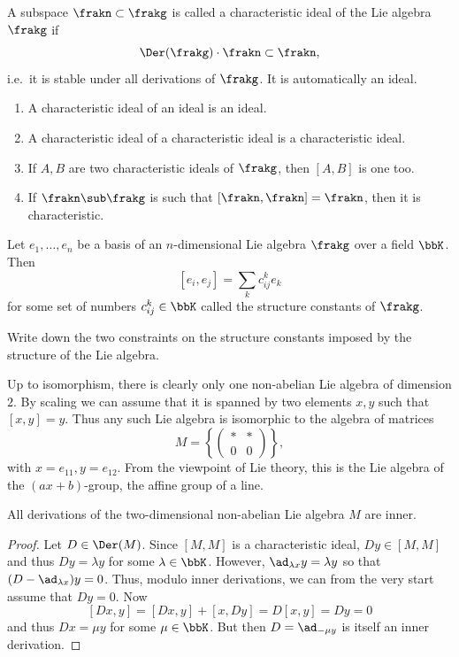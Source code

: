 \begin{defn}
    A subspace $\frakn\subset \frakg$ is called a characteristic ideal of the Lie algebra $\frakg$ if 
    \[\Der(\frakg)\cdot \frakn\subset \frakn,\]
    i.e.~it is stable under all derivations of $\frakg$. It is automatically an ideal.
\end{defn}

\begin{xca}
\begin{enumerate}
    \item A characteristic ideal of an ideal is an ideal.
    \item A characteristic ideal of a characteristic ideal is a characteristic ideal.
    \item If $A,B$ are two characteristic ideals of $\frakg$, then $[A,B]$ is one too.
    \item If $\frakn\sub \frakg$ is such that $[\frakn,\frakn]=\frakn$, then it is characteristic.
\end{enumerate}
\end{xca}

\begin{defn}
    Let $e_1,\ldots,e_n$ be a basis of an $n$-dimensional Lie algebra $\frakg$ over a field $\bbK$. Then
    \[[e_i,e_j]=\sum_k c_{ij}^k e_k\]
    for some set of numbers $c_{ij}^k\in\bbK$ called the structure constants of $\frakg$.
\end{defn}

\begin{xca}
    Write down the two constraints on the structure constants imposed by the structure of the Lie algebra.
\end{xca}

\begin{example}
    Up to isomorphism, there is clearly only one non-abelian Lie algebra of dimension $2$. By scaling we can assume that it is spanned by two elements $x,y$ such that $[x,y]=y$. Thus any such Lie algebra is isomorphic to the algebra of matrices 
    \[M=\left\{\begin{pmatrix}
        \ast &\ast \\
        0&0
    \end{pmatrix}\right\},\]
    with $x=e_{11}, y=e_{12}$. From the viewpoint of Lie theory, this is the Lie algebra of the $(ax+b)$-group, the affine group of a line.
\end{example}

\begin{lem}
    All derivations of the two-dimensional non-abelian Lie algebra $M$ are inner.
\end{lem}
\begin{proof}
    Let $D\in\Der(M)$. Since $[M,M]$ is a characteristic ideal, $Dy\in[M,M]$ and thus $Dy=\lambda y$ for some $\lambda\in\bbK$. However, $\ad_{\lambda x}y=\lambda y$ so that $(D-\ad_{\lambda x})y=0$. Thus, modulo inner derivations, we can from the very start assume that $Dy=0$. Now
    \[[Dx,y]=[Dx,y]+[x,Dy]=D[x,y]=Dy=0\]
    and thus $Dx=\mu y$ for some $\mu\in\bbK$. But then $D=\ad_{-\mu y}$ is itself an inner derivation.
\end{proof}

